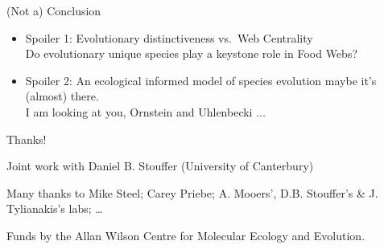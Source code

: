 \begin{frame}
{(Not a) Conclusion}

\begin{itemize}[<+->]
\item
  Spoiler 1: Evolutionary distinctiveness vs.~Web Centrality\\{Do
  evolutionary unique species play a keystone role in Food Webs?}
\item
  Spoiler 2: An ecological informed model of species evolution maybe
  it's (almost) there.\\{I am looking at you, Ornstein and Uhlenbecki
  $\dots$}
\end{itemize}

{Thanks!}

Joint work with Daniel B. Stouffer (University of Canterbury)

Many thanks to Mike Steel; Carey Priebe; A. Mooers', D.B. Stouffer's \&
J. Tylianakis's labs; \ldots{}

Funds by the Allan Wilson Centre for Molecular Ecology and Evolution.

\end{frame}
